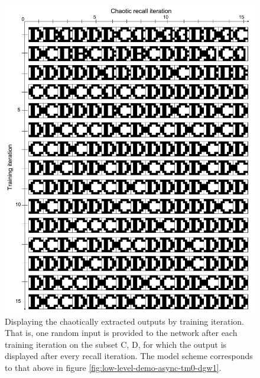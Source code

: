\begin{figure}
    \centering
    \includegraphics[width=12cm]{fig/CD-chaotic-recall-async-tm0-dgw1-tau050}
    \caption{Displaying the chaotically extracted outputs by training iteration. That is, one random input is provided to the network after each training iteration on the subset {C, D}, for which the output is displayed after every recall iteration. The model scheme corresponds to that above in figure \ref{fig:low-level-demo-async-tm0-dgw1}.}
\end{figure}

\cleardoublepage
